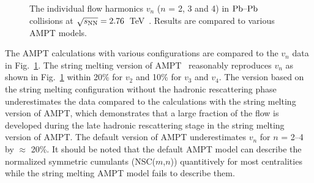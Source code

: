 \begin{figure}[h]
\begin{center}
        \caption{The individual flow harmonics $v_n$ ($n$ = 2, 3 and 4) in $\textnormal{Pb--Pb}$ collisions at $\sqrt{s_{\textnormal{NN}}}=2.76$~TeV~\cite{Adam:2016izf}. Results are compared to various AMPT models.}
        \label{fig:Figure_A3}
              \end{center}
\end{figure}

The AMPT calculations with various configurations are compared to the $v_n$ data in Fig.~\ref{fig:Figure_A3}.
The string melting version of AMPT~\cite{Lin:2001zk,Lin:2004en} reasonably reproduces $v_n$ as shown in Fig.~\ref{fig:Figure_A3} within 20\% for $v_2$ and 10\% for $v_3$ and $v_4$. The version based on the string melting configuration without the hadronic rescattering phase underestimates the data compared to the calculations with the string melting version of AMPT, which demonstrates that a large fraction of the flow is developed during the late hadronic rescattering stage in the string melting version of AMPT.
The default version of AMPT underestimates $v_n$ for $n$ = 2--4 by $\approx$ 20\%. It should be noted that the default AMPT model can describe the normalized symmetric cumulants (NSC($m$,$n$)) quantitively for most centralities while the string melting AMPT model fails to describe them.

